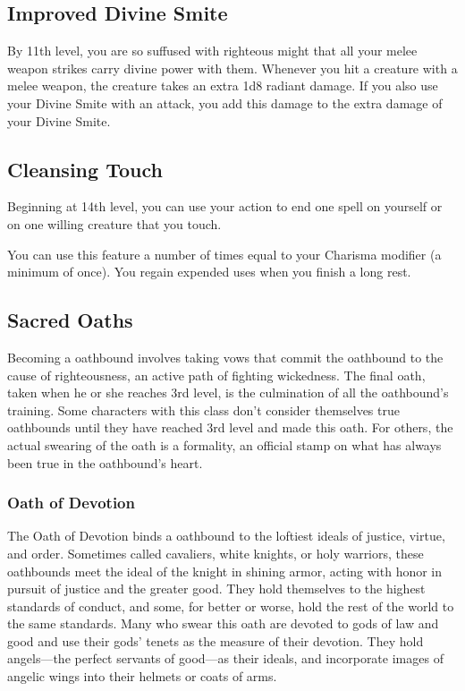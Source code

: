 \subsection{Improved Divine Smite}

By 11th level, you are so suffused with righteous might that all your melee weapon strikes carry divine power with them. Whenever you hit a creature with a melee weapon, the creature takes an extra 1d8 radiant damage. If you also use your Divine Smite with an attack, you add this damage to the extra damage of your Divine Smite.

\subsection{Cleansing Touch}

Beginning at 14th level, you can use your action to end one spell on yourself or on one willing creature that you touch.

You can use this feature a number of times equal to your Charisma modifier (a minimum of once). You regain expended uses when you finish a long rest.

\subsection{Sacred Oaths}

Becoming a oathbound involves taking vows that commit the oathbound to the cause of righteousness, an active path of fighting wickedness. The final oath, taken when he or she reaches 3rd level, is the culmination of all the oathbound’s training. Some characters with this class don’t consider themselves true oathbounds until they have reached 3rd level and made this oath. For others, the actual swearing of the oath is a formality, an official stamp on what has always been true in the oathbound’s heart.

\subsubsection{Oath of Devotion}

The Oath of Devotion binds a oathbound to the loftiest ideals of justice, virtue, and order. Sometimes called cavaliers, white knights, or holy warriors, these oathbounds meet the ideal of the knight in shining armor, acting with honor in pursuit of justice and the greater good. They hold themselves to the highest standards of conduct, and some, for better or worse, hold the rest of the world to the same standards. Many who swear this oath are devoted to gods of law and good and use their gods’ tenets as the measure of their devotion. They hold angels—the perfect servants of good—as their ideals, and incorporate images of angelic wings into their helmets or coats of arms.

